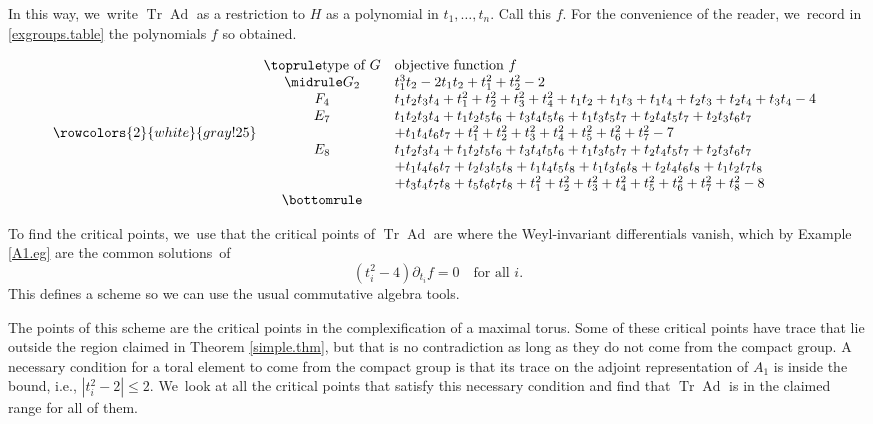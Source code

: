 \documentclass[JEP,XML,SOM,Unicode,NoFloatCountersInSection,published]{cedram}
\theoremstyle{definition}
\DeclareMathOperator{\Tr}{Tr}
\DeclareMathOperator{\Ad}{Ad}
\begin{document}
In this way, we~write $\Tr \Ad$ as a restriction to $H$ as a polynomial in $t_1, \ldots, t_n$. Call this $f$. For the convenience of the reader, we~record in \autoref{exgroups.table} the polynomials $f$ so obtained.
\begin{table}[hbtp]
\caption{\label{exgroups.table}The restriction $f$ of $\Tr \Ad$ from $G$ to a copy of $A_1^{\times n}$.}
\[
{\rowcolors{2}{white}{gray!25}
\begin{array}{cl} \toprule
\text{type of $G$}& \text{objective function $f$} \\ \midrule
G_2& t_1^3 t_2 - 2 t_1 t_2 + t_1^2+ t_2^2 - 2\\
F_4& t_1 t_2 t_3 t_4 + t_1^2 + t_2^2 + t_3^2 + t_4^2+ t_1 t_2 + t_1 t_3+ t_1 t_4 + t_2 t_3 + t_2 t_4 + t_3 t_4 - 4\\
E_7&t_1t_2t_3t_4 + t_1t_2t_5t_6 + t_3t_4t_5t_6 + t_1t_3t_5t_7 + t_2t_4t_5t_7 + t_2t_3t_6t_7 \\
&+ t_1t_4t_6t_7 + t_1^2 + t_2^2 + t_3^2 + t_4^2 + t_5^2 + t_6^2 + t_7^2 - 7 \\
E_8& t_1t_2t_3t_4 + t_1t_2t_5t_6 + t_3t_4t_5t_6 + t_1t_3t_5t_7 + t_2t_4t_5t_7 + t_2t_3t_6t_7 \\
&+ t_1t_4t_6t_7 + t_2t_3t_5t_8 + t_1t_4t_5t_8 + t_1t_3t_6t_8 + t_2t_4t_6t_8 + t_1t_2t_7t_8 \\
&+ t_3t_4t_7t_8 + t_5t_6t_7t_8 + t_1^2 + t_2^2 + t_3^2 + t_4^2 + t_5^2 + t_6^2 + t_7^2 + t_8^2 - 8\\ \bottomrule
\end{array}}
\]
\end{table}

To find the critical points, we~use that the critical points of $\Tr \Ad$ are where the Weyl-invariant differentials vanish, which by Example \ref{A1.eg} are the common solutions~of
\begin{equation} \label{inv.diff}
(t_i^2 - 4) \partial_{t_i} f = 0 \quad \text{for all $i$}.
\end{equation}
This defines a scheme so we can use the usual commutative algebra tools.

The points of this scheme are the critical points in the complexification of a maximal torus. Some of these critical points have trace that lie outside the region claimed in Theorem \ref{simple.thm}, but that is no contradiction as long as they do not come from the compact group. A necessary condition for a toral element to come from the compact group is that its trace on the adjoint representation of $A_1$ is inside the bound, i.e., $| t_i^2 - 2 | \le 2$. We~look at all the critical points that satisfy this necessary condition and find that $\Tr \Ad$ is in the claimed range for all of them.
\end{document}
